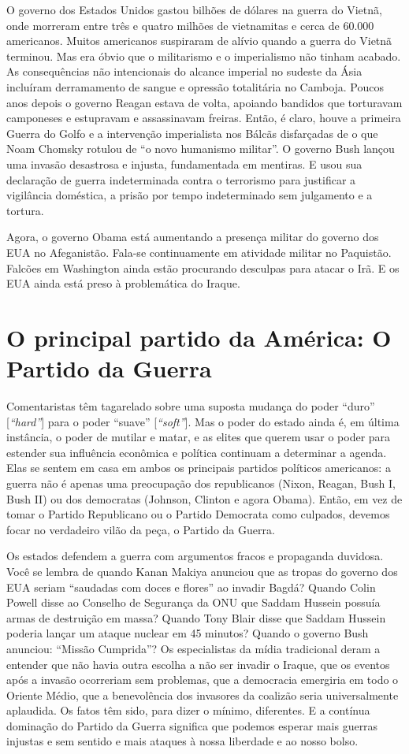 O governo dos Estados Unidos gastou bilhões de dólares na guerra do Vietnã, onde morreram entre três e quatro milhões de vietnamitas e cerca de 60.000 americanos. Muitos americanos suspiraram de alívio quando a guerra do Vietnã terminou. Mas era óbvio que o militarismo e o imperialismo não tinham acabado. As consequências não intencionais do alcance imperial no sudeste da Ásia incluíram derramamento de sangue e opressão totalitária no Camboja. Poucos anos depois o governo Reagan estava de volta, apoiando bandidos que torturavam camponeses e estupravam e assassinavam freiras. Então, é claro, houve a primeira Guerra do Golfo e a intervenção imperialista nos Bálcãs disfarçadas de o que Noam Chomsky rotulou de ``o novo humanismo militar''. O governo Bush lançou uma invasão desastrosa e injusta, fundamentada em mentiras. E usou sua declaração de guerra indeterminada contra o terrorismo para justificar a vigilância doméstica, a prisão por tempo indeterminado sem julgamento e a tortura.

Agora, o governo Obama está aumentando a presença militar do governo dos EUA no Afeganistão. Fala-se continuamente em atividade militar no Paquistão. Falcões em Washington ainda estão procurando desculpas para atacar o Irã. E os EUA ainda está preso à problemática do Iraque.

\section{O principal partido da América: O Partido da Guerra}

Comentaristas têm tagarelado sobre uma suposta mudança do poder ``duro'' [\emph{``hard''}] para o poder ``suave'' [\emph{``soft''}]. Mas o poder do estado ainda é, em última instância, o poder de mutilar e matar, e as elites que querem usar o poder para estender sua influência econômica e política continuam a determinar a agenda. Elas se sentem em casa em ambos os principais partidos políticos americanos: a guerra não é apenas uma preocupação dos republicanos (Nixon, Reagan, Bush I, Bush II) ou dos democratas (Johnson, Clinton e agora Obama). Então, em vez de tomar o Partido Republicano ou o Partido Democrata como culpados, devemos focar no verdadeiro vilão da peça, o Partido da Guerra.

Os estados defendem a guerra com argumentos fracos e propaganda duvidosa. Você se lembra de quando Kanan Makiya anunciou que as tropas do governo dos EUA seriam ``saudadas com doces e flores'' ao invadir Bagdá? Quando Colin Powell disse ao Conselho de Segurança da ONU que Saddam Hussein possuía armas de destruição em massa? Quando Tony Blair disse que Saddam Hussein poderia lançar um ataque nuclear em 45 minutos? Quando o governo Bush anunciou: ``Missão Cumprida''? Os especialistas da mídia tradicional deram a entender que não havia outra escolha a não ser invadir o Iraque, que os eventos após a invasão ocorreriam sem problemas, que a democracia emergiria em todo o Oriente Médio, que a benevolência dos invasores da coalizão seria universalmente aplaudida. Os fatos têm sido, para dizer o mínimo, diferentes. E a contínua dominação do Partido da Guerra significa que podemos esperar mais guerras injustas e sem sentido e mais ataques à nossa liberdade e ao nosso bolso.

